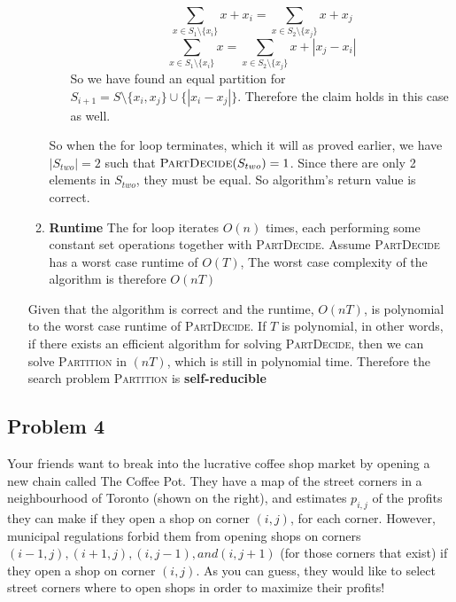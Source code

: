 \documentclass[11pt]{article}
\begin{document}
\begin{enumerate}
\begin{solution}
\begin{enumerate}
\begin{enumerate}
                \[
                     \sum_{x\in S_1 \setminus \{x_i \}} x  + x_i= \sum_{x\in S_2 \setminus \{x_j \}} x + x_j
                \]
                \[
                     \sum_{x\in S_1 \setminus \{x_i \}} x = \sum_{x\in S_2 \setminus \{x_j \}} x + | x_j - x_i |
                \]
                So we have found an equal partition for $S_{i+1} = S \setminus \{x_i, x_j\}\cup \{ |x_i - x_j| \}$. Therefore the claim holds in this case as well. 
            \end{enumerate}
            So when the for loop terminates, which it will as proved earlier, we have $|S_{two}| = 2$ such that $\textsc{PartDecide}(S_{two}) = 1$. Since there are only 2 elements in $S_{two}$, they must be equal. So algorithm's return value is correct. 
            \item \textbf{Runtime} The for loop iterates $O(n)$ times, each performing some constant set operations together with \textsc{PartDecide}. Assume \textsc{PartDecide} has a worst case runtime of $O(T)$, The worst case complexity of the algorithm is therefore $O(nT)$
        \end{enumerate}
        Given that the algorithm is correct and the runtime, $O(nT)$, is polynomial to the worst case runtime of \textsc{PartDecide}. If $T$ is polynomial, in other words, if there exists an efficient algorithm for solving \textsc{PartDecide}, then we can solve \textsc{Partition} in $(nT)$, which is still in polynomial time. Therefore the search problem \textsc{Partition} is \textbf{self-reducible} 
    \end{solution}
\end{enumerate}


\subsection*{Problem 4}


Your friends want to break into the lucrative coffee shop market by opening a new chain called The Coffee Pot. They have a map of the street corners in
a neighbourhood of Toronto (shown on the right), and estimates $p_{i,j}$ of the profits they can make if they open a shop on corner $(i,j)$, for each corner.
However, municipal regulations forbid them from opening shops on corners $(i-1,j), (i + 1,j), (i,j-1), and (i,j + 1)$ (for those corners that exist) if they
open a shop on corner $(i,j)$. As you can guess, they would like to select street
corners where to open shops in order to maximize their profits!
\end{document}
